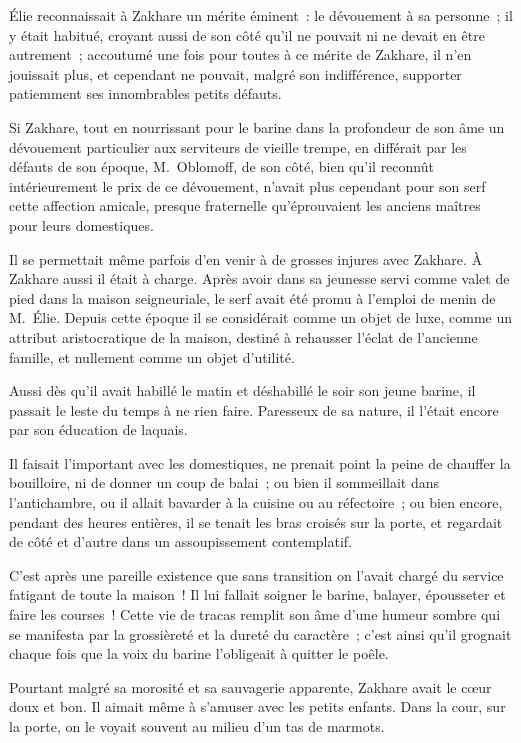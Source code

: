 \documentclass[french,twoside]{book} %
\begin{document}
Élie reconnaissait à Zakhare un mérite éminent : le dévouement à sa personne ; il y était habitué, croyant aussi de son côté qu’il ne pouvait ni ne devait en être autrement ; accoutumé une fois pour toutes à ce mérite de Zakhare, il n’en jouissait plus, et cependant ne pouvait, malgré son indifférence, supporter patiemment ses innombrables petits défauts.\par
Si Zakhare, tout en nourrissant pour le barine dans la profondeur de son âme un dévouement particulier aux serviteurs de vieille trempe, en différait par les défauts de son époque, M. Oblomoff, de son côté, bien qu’il reconnût intérieurement le prix de ce dévouement, n’avait plus cependant pour son serf cette affection amicale, presque fraternelle qu’éprouvaient les anciens maîtres pour leurs domestiques.\par
Il se permettait même parfois d’en venir à de grosses injures avec Zakhare. À Zakhare aussi il était à charge. Après avoir dans sa jeunesse servi comme valet de pied dans la maison seigneuriale, le serf avait été promu à l’emploi de menin de M. Élie. Depuis cette époque il se considérait comme un objet de luxe, comme un attribut aristocratique de la maison, destiné à rehausser l’éclat de l’ancienne famille, et nullement comme un objet d’utilité.\par
Aussi dès qu’il avait habillé le matin et déshabillé le soir son jeune barine, il passait le leste du temps à ne rien faire. Paresseux de sa nature, il l’était encore par son éducation de laquais.\par
Il faisait l’important avec les domestiques, ne prenait point la peine de chauffer la bouilloire, ni de donner un coup de balai ; ou bien il sommeillait dans l’antichambre, ou il allait bavarder à la cuisine ou au réfectoire ; ou bien encore, pendant des heures entières, il se tenait les bras croisés sur la porte, et regardait de côté et d’autre dans un assoupissement contemplatif.\par
C’est après une pareille existence que sans transition on l’avait chargé du service fatigant de toute la maison ! Il lui fallait soigner le barine, balayer, épousseter et faire les courses ! Cette vie de tracas remplit son âme d’une humeur sombre qui se manifesta par la grossièreté et la dureté du caractère ; c’est ainsi qu’il grognait chaque fois que la voix du barine l’obligeait à quitter le poêle.\par
Pourtant malgré sa morosité et sa sauvagerie apparente, Zakhare avait le cœur doux et bon. Il aimait même à s’amuser avec les petits enfants. Dans la cour, sur la porte, on le voyait souvent au milieu d’un tas de marmots.\par
\end{document}
